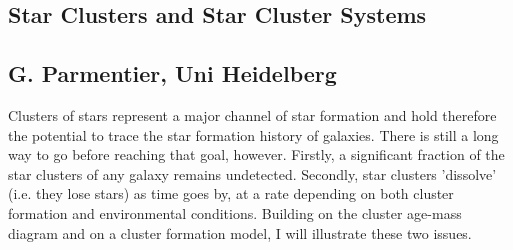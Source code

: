 \subsection*{Star Clusters and Star Cluster Systems}
\subsection*{G. Parmentier, Uni Heidelberg}
\noindent Clusters of stars represent a major channel of star formation and
hold therefore the potential to trace the star formation history of galaxies.
There is still a long way to go before reaching that goal, however.
Firstly, a significant fraction of the star clusters of any galaxy remains
undetected.  Secondly, star clusters 'dissolve' (i.e. they lose stars) as time
goes by, at a rate depending on both cluster formation and
environmental conditions.  Building on the cluster age-mass diagram and
on a cluster formation model, I will illustrate these two issues. 
